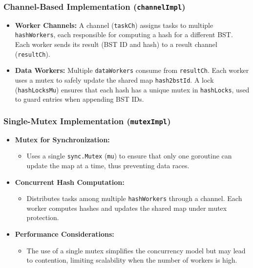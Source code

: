 \documentclass[letterpaper,12pt]{article}
\theoremstyle{remark}
\begin{document}
\subsubsection*{Channel-Based Implementation (\texttt{channelImpl})}
\begin{itemize}
    \item \textbf{Worker Channels:} A channel (\texttt{taskCh}) assigns tasks to multiple \texttt{hashWorkers}, each responsible for computing a hash for a different BST. Each worker sends its result (BST ID and hash) to a result channel (\texttt{resultCh}).
    \item \textbf{Data Workers:} Multiple \texttt{dataWorkers} consume from \texttt{resultCh}. Each worker uses a mutex to safely update the shared map \texttt{hash2bstId}. A lock (\texttt{hashLocksMu}) ensures that each hash has a unique mutex in \texttt{hashLocks}, used to guard entries when appending BST IDs.
\end{itemize}


\subsubsection*{Single-Mutex Implementation (\texttt{mutexImpl})}
\begin{itemize}
       
    \item \textbf{Mutex for Synchronization:}
    \begin{itemize}
        \item Uses a single \texttt{sync.Mutex} (\texttt{mu}) to ensure that only one goroutine can update the map at a time, thus preventing data races.
    \end{itemize}
    
    \item \textbf{Concurrent Hash Computation:}
    \begin{itemize}
        \item Distributes tasks among multiple \texttt{hashWorkers} through a channel. Each worker computes hashes and updates the shared map under mutex protection.
    \end{itemize}
    
    \item \textbf{Performance Considerations:}
    \begin{itemize}
        \item The use of a single mutex simplifies the concurrency model but may lead to contention, limiting scalability when the number of workers is high.
    \end{itemize}
\end{itemize}
\end{document}
